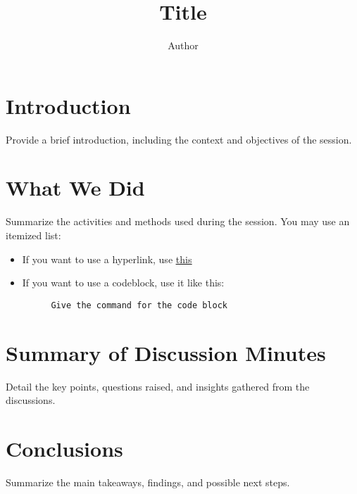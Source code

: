 \documentclass[a4paper,12pt]{article}
\title{#1}
\newcommand{\titlepacket}[1]{
    \title{#1}
}
\begin{document}
\titlepacket{Title}
\author{Author}
\maketitle

\section{Introduction}
Provide a brief introduction, including the context and objectives of the session.

\section{What We Did}
Summarize the activities and methods used during the session.
You may use an itemized list:
\begin{itemize}
    \item If you want to use a hyperlink, use \href{giveyourlink}{\uline{this}}
    \item If you want to use a codeblock, use it like this:
\end{itemize}
       \begin{verbatim}
         Give the command for the code block
       \end{verbatim}

\section{Summary of Discussion Minutes}
Detail the key points, questions raised, and insights gathered from the discussions.

\section{Conclusions}
Summarize the main takeaways, findings, and possible next steps.
\end{document}

